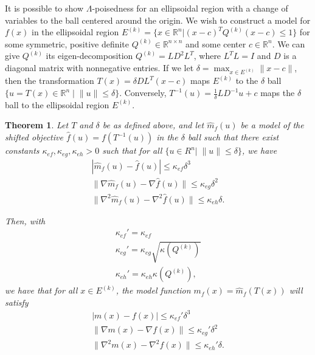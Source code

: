 \documentclass{article}
\newtheorem{theorem}{Theorem}[section]
\theoremstyle{case}
\newcommand{\ellipsek}{{E^{(k)}}}
\newcommand{\qk}{{Q^{(k)}}}
\begin{document}
It is possible to show $\Lambda$-poisedness for an ellipsoidal region with a change of variables to the ball centered around the origin.
We wish to construct a model for $f(x)$ in the ellipsoidal region
$\ellipsek = \{x \in \mathbb R^n | (x - c)^T\qk(x - c) \le 1\}$ for some symmetric, positive definite
$\qk \in \mathbb R^{n\times n}$ and some center $c \in \mathbb R^n$.
We can give $\qk$ its eigen-decomposition $\qk = L D^2 L^T$, where $L^TL = I$ and $D$ is a diagonal matrix with nonnegative entries.
If we let $\delta = \max_{x\in \ellipsek}\|x-c\|$, then the transformation $T(x) = \delta DL^T(x - c)$ maps $ \ellipsek $ to the $\delta$ ball $\{u = T(x) \in \mathbb R^n \; | \; \|u\| \le \delta\}$.
Conversely, $ T^{-1}(u) = \frac 1 {\delta} LD^{-1}u + c$ maps the $\delta$ ball to the ellipsoidal region $ \ellipsek $.


\begin{theorem}
Let $T$ and $\delta$ be as defined above, and let $\hat m_f(u)$ be a model of the shifted objective $\hat f(u) = f(T^{-1}(u))$ in the $\delta$ ball such that
there exist constants $\kappa_{ef}, \kappa_{eg}, \kappa_{eh} > 0$ such that for all $\{u \in R^n | \;\|u\| \le \delta \}$, we have
\begin{align*}
|\hat m_f(u) - \hat f(u)| \le \kappa_{ef} \delta^3\\
\|\nabla \hat m_f(u) - \nabla \hat f(u)\| \le \kappa_{eg}\delta^2\\
\|\nabla^2 \hat m_f(u) - \nabla^2 \hat f(u)\| \le \kappa_{eh}\delta.
\end{align*}

Then, with
\begin{align*}
\kappa_{ef}' = \kappa_{ef} \\
\kappa_{eg}' = \kappa_{eg}\sqrt{\kappa(\qk)} \\
\kappa_{eh}' = \kappa_{eh}\kappa(\qk),
\end{align*}
we have that for all $x \in \ellipsek$,
the model function $m_f(x) = \hat m_f(T(x))$ will satisfy
\begin{align*}
| m(x) - f(x)| \le \kappa_{ef}'\delta^3 \\
\|\nabla  m(x) - \nabla  f(x)\| \le \kappa_{eg}'\delta^2 \\
\|\nabla^2 m(x) - \nabla^2 f(x)\| \le \kappa_{eh}'\delta.
\end{align*}
\end{theorem}
\end{document}
